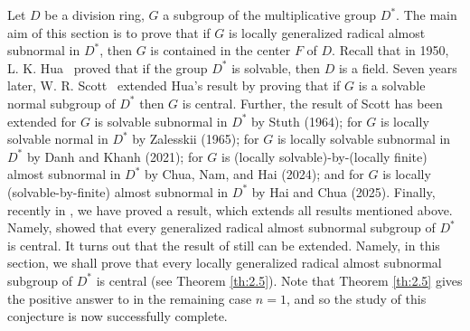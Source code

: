 \documentclass{amsart}
\theoremstyle{definition}
\begin{document}
Let $D$ be a division ring, $G$ a subgroup of the multiplicative group $D^*$. The main aim of this section is to prove that if $G$ is  locally generalized radical almost subnormal in $D^*$, then $G$ is contained in the center $F$ of $D$. Recall that in 1950, L. K. Hua~\cite{Pa_Hua_1950} proved that if the group $D^*$ is solvable, then $D$ is a field. 
Seven years later, W. R. Scott~\cite{Pa_Scott_1957}  extended Hua's result by proving that if $G$ is a solvable normal subgroup of $D^*$ then $G$ is central. Further, the result of Scott has been extended for $G$ is solvable subnormal in $D^*$  by Stuth \cite[Theorem 4]{Pa_Stuth_1964} (1964); for $G$ is locally solvable normal in $D^*$  by Zalesskii \cite[Theorem 2]{Pa_Zalesskii_1965} (1965);  for $G$ is locally solvable subnormal in $D^*$ by Danh and Khanh \cite[Theorem 1]{Pa_Danh-Khanh_2021} (2021); for $G$ is (locally solvable)-by-(locally finite) almost subnormal in $D^*$ by Chua, Nam, and Hai \cite[Theorem 2.6]{Pa_ChNaHa_24} (2024); and for $G$ is locally (solvable-by-finite) almost subnormal in $D^*$ by Hai and Chua \cite[Theorem 3.9]{Pa_HaiChua_2025} (2025). 
Finally, recently in \cite{Pa_ChuaHai_2026}, we have proved a result, which extends all results mentioned above. Namely, \cite[Theorem 3.5]{Pa_ChuaHai_2026} showed that every generalized radical almost subnormal subgroup of $D^*$ is central. It turns out that the result of \cite[Theorem 3.5]{Pa_ChuaHai_2026} still can be extended.
Namely, in this section, we shall prove that 
every locally generalized radical almost subnormal subgroup of $D^*$ is central (see Theorem \ref{th:2.5}). Note that Theorem \ref{th:2.5} gives the positive answer to \cite[Conjecture 1]{Pa_ChuaHai_2026} in the remaining case $n=1$, and so the study of this conjecture is now successfully complete.
\end{document}
